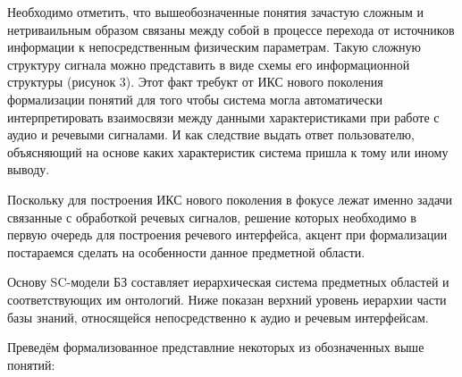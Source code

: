 Необходимо отметить, что вышеобозначенные понятия зачастую сложным и нетриваильным образом связаны между собой в процессе перехода от источников информации к непосредственным физическим параметрам. Такую сложную структуру сигнала можно представить в виде схемы его информационной структуры (рисунок 3). Этот факт требукт от ИКС нового поколения формализации понятий для того чтобы система могла автоматически интерпретировать взаимосвязи между данными характеристиками при работе с аудио и речевыми сигналами. И как следствие выдать ответ пользователю, объясняющий на основе каких характеристик система пришла к тому или иному выводу. 

Поскольку для построения ИКС нового поколения в фокусе лежат именно задачи связанные с обработкой речевых сигналов, решение которых необходимо в первую очередь для построения речевого интерфейса, акцент при формализации постараемся сделать на особенности данное предметной области.

Основу SC-модели БЗ составляет иерархическая система предметных областей и соответствующих им онтологий. Ниже показан верхний уровень иерархии части базы знаний, относящейся непосредственно к аудио и речевым интерфейсам.

Преведём формализованное представлние некоторых из обозначенных выше понятий:

\begin{SCn}
\begin{scnindent}
\end{scnindent}
\begin{scnindent}
\end{scnindent}
\begin{scnindent}
\end{scnindent}
\end{SCn}
 
